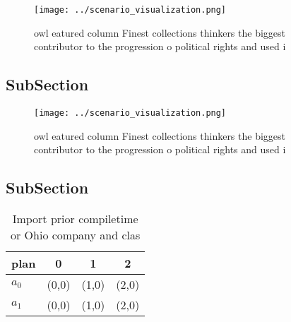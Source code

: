 \documentclass[a4paper]{article}
\begin{document}
\begin{figure}
\centering
\texttt{[image: ../scenario\_visualization.png]}
\caption{owl eatured column Finest collections thinkers the biggest contributor to the progression o political rights and used i
}
\end{figure}
 
\subsection{SubSection}

\begin{figure}
\centering
\texttt{[image: ../scenario\_visualization.png]}
\caption{owl eatured column Finest collections thinkers the biggest contributor to the progression o political rights and used i
}
\end{figure}
 
\subsection{SubSection}

\begin{table}
\begin{adjustbox}{width=0.6\columnwidth}
\begin{tabular}{|l|l|l|l|}
\hline
\textbf{plan} & \multicolumn{1}{c|}{\textbf{0}} & \multicolumn{1}{c|}{\textbf{1}} & \multicolumn{1}{c|}{\textbf{2}} \\ \hline
\textbf{$a_0$}  & (0,0) & (1,0) & (2,0) \\ \hline
\textbf{$a_1$}  & (0,0) & (1,0) & (2,0) \\ \hline
\end{tabular}
\end{adjustbox}
\caption{Import prior compiletime or Ohio company and clas
}
\end{table}
\end{document}
